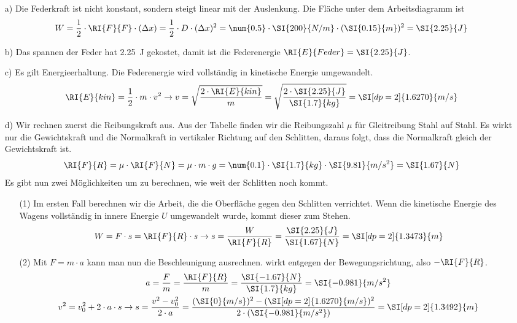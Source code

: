 \begin{aufgabe}
	
	\begin{loesung}
		\begin{itemize}
			\item [a)] Die Federkraft ist nicht konstant, sondern steigt linear mit der Auslenkung.
				Die Fläche unter dem Arbeitsdiagramm ist 
				\begin{eqnarray*}
				W=\frac{1}{2}\cdot\RI{F}{F}\cdot(\Delta x)=\frac{1}{2}\cdot D\cdot (\Delta x)^2=\num{0.5}\cdot\SI{200}{N/m}\cdot(\SI{0.15}{m})^2=\SI{2.25}{J}
				\end{eqnarray*}
			\item[b)] Das spannen der Feder hat \SI{2.25}{J} gekostet, damit ist die Federenergie $\RI{E}{Feder}=\SI{2.25}{J}$.
			\item[c)] Es gilt Energieerhaltung. Die Federenergie wird vollständig in kinetische Energie umgewandelt.
				\begin{eqnarray*}
					\RI{E}{kin}=\frac{1}{2}\cdot m\cdot v^2 \to v=\sqrt{\frac{2\cdot \RI{E}{kin}}{m}} =\sqrt{\frac{2\cdot\SI{2.25}{J}}{\SI{1.7}{kg}}}=\SI[dp=2]{1.6270}{m/s}
				\end{eqnarray*}
			\item[d)] Wir rechnen zuerst die Reibungskraft aus. Aus der Tabelle finden wir die Reibungszahl $\mu$ für Gleitreibung Stahl auf Stahl.
				Es wirkt nur die Gewichtskraft und die Normalkraft in vertikaler Richtung auf den Schlitten, 
				daraus folgt, dass die Normalkraft gleich
				der Gewichtskraft ist.
				\begin{eqnarray*}
					\RI{F}{R}=\mu\cdot\RI{F}{N}=\mu\cdot m\cdot g=\num{0.1}\cdot\SI{1.7}{kg}\cdot\SI{9.81}{m/s^2}=\SI{1.67}{N}
				\end{eqnarray*}
	Es gibt nun zwei Möglichkeiten um zu berechnen, wie weit der Schlitten noch kommt.
	\begin{itemize}
		\item [(1)] Im ersten Fall berechnen wir die Arbeit, die die Oberfläche gegen den Schlitten verrichtet.
			Wenn die kinetische Energie des Wagens vollständig in innere Energie $U$ umgewandelt wurde, kommt dieser zum Stehen.
			\begin{eqnarray*}
				W=F\cdot s =\RI{F}{R}\cdot s \to s =\frac{W}{\RI{F}{R}}=\frac{\SI{2.25}{J}}{\SI{1.67}{N}}=\SI[dp=2]{1.3473}{m}
			\end{eqnarray*}
		\item[(2)]			
				Mit $F=m\cdot a$ kann man nun die Beschleunigung ausrechnen.  wirkt entgegen der Bewegungsrichtung, also $-\RI{F}{R}$.
\begin{gather*}
	a=\frac{F}{m} =\frac{\RI{F}{R}}{m}=\frac{\SI{-1.67}{N}}{\SI{1.7}{kg}}=\SI{-0.981}{m/s^2}\\
	v^2=v_0^2+2\cdot a\cdot s \to s=\frac{v^2-v_0^2}{2\cdot a}=\frac{(\SI{0}{m/s})^2-(\SI[dp=2]{1.6270}{m/s})^2}{2\cdot(\SI{-0.981}{m/s^2})}=\SI[dp=2]{1.3492}{m}
\end{gather*}

	\end{itemize}
		\end{itemize}
	\end{loesung}

\end{aufgabe}
